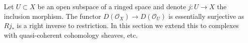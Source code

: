 \noindent
Let $U \subset X$ be an open subspace of a ringed space
and denote $j : U \to X$ the inclusion morphism. The functor
$D(\mathcal{O}_X) \to D(\mathcal{O}_U)$ is essentially surjective as
$Rj_*$ is a right inverse to restriction.
In this section we extend this to complexes with quasi-coherent cohomology
sheaves, etc.
